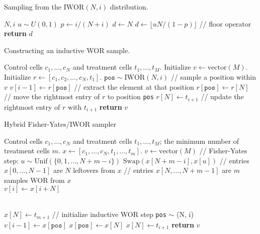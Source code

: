 \documentclass[12pt]{article}
\begin{document}
\begin{algorithm}
	\caption{Sampling from the $\textrm{IWOR}(N,i)$ distribution.}\label{alg:iwor_dist}
	\begin{algorithmic}
		\Require $N, i$ 
		\State $u \sim U(0,1)$
		\State $p \leftarrow i/(N+i)$
		\State $d \leftarrow N$
		\Else 
		\State $d \leftarrow \lfloor uN/(1-p) \rfloor $ // floor operator
		\EndIf
		\State \textbf{return} $d$
	\end{algorithmic}
\end{algorithm}

\begin{algorithm}
	\caption{Constructing an inductive WOR sample.}\label{alg:iwor_sample}
	\begin{algorithmic}
		\Require Control cells $c_1, \dots, c_N$ and treatment cells $t_1, \dots, t_M$.
		\State Initialize $v \leftarrow \textrm{vector}(M).$
		\State Initialize $r \leftarrow [ c_1, c_2, \dots, c_N, t_1 ].$
		\For{i = 1 $\dots$ M }
		\State $\texttt{pos} \sim \textrm{IWOR}(N, i)$ // sample a position within $v$
		\State $v[i-1] \leftarrow r[\texttt{pos}] $ // extract the element at that position
		\State $ r[\texttt{pos}] \leftarrow r[N]$ // move the rightmost entry of $r$ to position \texttt{pos}
		\State $r[N] \leftarrow t_{i+1}$ // update the rightmost entry of $r$ with $t_{i+1}$
		\EndFor
		\State \textbf{return} $v$
	\end{algorithmic}
\end{algorithm}


\begin{algorithm}
\caption{Hybrid Fisher-Yates/IWOR sampler}
\begin{algorithmic}
\Require Control cells $c_1, \dots, c_N$ and treatment cells $t_1, \dots, t_M$; the minimum number of treatment cells $m$.
\State $x \leftarrow [c_1, \dots, c_N, t_1, \dots, t_m].$
\State $v \leftarrow \textrm{vector}(M)$ 
 // Fisher-Yates step:
\State $u \sim \textrm{Unif}(\{0, 1, \dots, N + m - i\})$
\State $\textrm{Swap}(x[N + m - i], x[u])$
\EndFor
\State // entries $x[0, \dots, N - 1]$ are $N$ leftovers from $x$
\State // entries $x[N, \dots, N + m - 1]$ are $m$ samples WOR from $x$
\\
\State $v[i] \leftarrow x[i + N]$
\EndFor

\\ 
\State $x[N] \leftarrow t_{m+1}$ // initialize inductive WOR step
\State \texttt{pos} $\sim$ (N, i)
\State $v[i - 1] \leftarrow x[\texttt{pos}]$
\State $x[\texttt{pos}] \leftarrow x[N]$
\State $x[N] \leftarrow t_{i+1}$
\EndFor
\State \textbf{return} $v$
\end{algorithmic}
\end{algorithm}
\end{document}
